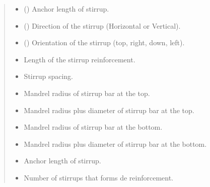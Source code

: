 \documentclass[a4paper,10pt,english]{sphinxmanual}
\begin{document}
\begin{fulllineitems}
\begin{quote}
\begin{description}
\begin{itemize}
\item {} 
\sphinxAtStartPar
{} () \textendash{} Anchor length of stirrup.

\item {} 
\sphinxAtStartPar
{} () \textendash{} Direction of the stirrup (Horizontal or Vertical).

\item {} 
\sphinxAtStartPar
{} () \textendash{} Orientation of the stirrup (top, right, down, left).

\end{itemize}

\begin{itemize}
\item {} 
\sphinxAtStartPar
{} \textendash{} Length of the stirrup reinforcement.

\item {} 
\sphinxAtStartPar
{} \textendash{} Stirrup spacing.

\item {} 
\sphinxAtStartPar
{} \textendash{} Mandrel radius of stirrup bar at the top.

\item {} 
\sphinxAtStartPar
{} \textendash{} Mandrel radius plus diameter of stirrup bar at the top.

\item {} 
\sphinxAtStartPar
{} \textendash{} Mandrel radius of stirrup bar at the bottom.

\item {} 
\sphinxAtStartPar
{} \textendash{} Mandrel radius plus diameter of stirrup bar at the bottom.

\item {} 
\sphinxAtStartPar
{} \textendash{} Anchor length of stirrup.

\item {} 
\sphinxAtStartPar
{} \textendash{} Number of stirrups that forms de reinforcement.


\end{itemize}
\end{description}
\end{quote}
\end{fulllineitems}
\end{document}
